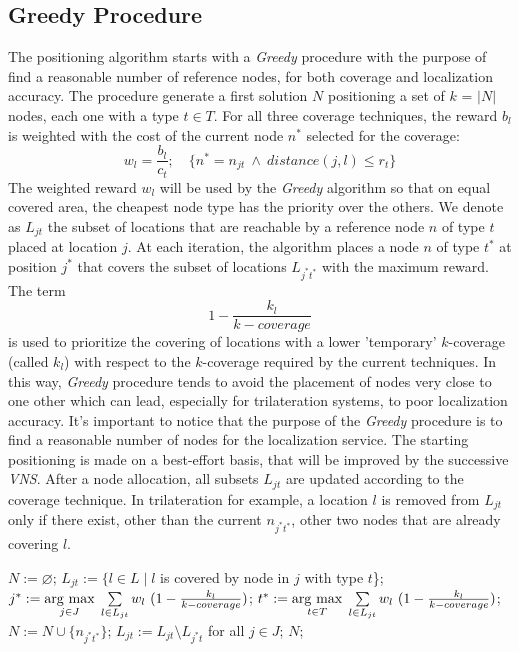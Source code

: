 \subsection{Greedy Procedure}\label{subsec:greedy}
The positioning algorithm starts with a \emph{Greedy} procedure with the purpose of find a reasonable number of reference nodes, for both coverage and localization accuracy. The procedure generate a first solution \(N\) positioning a set of \(k\) = $\lvert N \rvert$ nodes, each one with a type \(t \in T\).
For all three coverage techniques, the reward $b_l$ is weighted with the cost of the current node $n^*$ selected for the coverage:
\begin{equation}\label{eq:w}
w_l = \frac{b_l}{ c_t}; \quad \{n^*=n_{jt} ~ \land ~ distance(j,l)  \leq r_t\}
\end{equation}
The weighted reward $w_l$ will be used by the \emph{Greedy} algorithm so that on equal covered area, the cheapest node type has the priority over the others.
We denote as \(L_{jt}\) the subset of locations that are reachable by a reference node \(n\) of type \(t\) placed at location \(j\). At each iteration, the algorithm places a node \(n\) of type \(t^*\) at position \(j^*\) that covers the subset of locations \(L_{j^*t^*}\) with the maximum reward. The term
\begin{equation}\label{eq:kcov}
1 - \frac{k_l}{k-coverage}
\end{equation}
is used to prioritize the covering of locations with a lower 'temporary' \mbox{$k$-coverage} (called $k_l$) with respect to the \mbox{$k$-coverage} required by the current techniques. In this way, \emph{Greedy} procedure tends to avoid the placement of nodes very close to one other which can lead, especially for trilateration systems, to poor localization accuracy.
It's important to notice that the purpose of the \emph{Greedy} procedure is to find a reasonable number of nodes for the localization service. The starting positioning is made on a best-effort basis, that will be improved by the successive \emph{VNS}.
After a node allocation, all subsets \(L_{jt}\) are updated according to the coverage technique. In trilateration for example, a location \(l\) is removed from \(L_{jt}\) only if there exist, other than the current  \(n_{j^*t^*}\), other two nodes that are already covering \(l\).

\begin{algorithm}
\caption{\(Greedy(L, J, T, w, target)\)}
\begin{algorithmic}%
\label{alg:greedy}
\State $N := \varnothing$;
\State $L_{jt} := \{l \in L \mid l$ is covered by node in \(j\) with type \(t\)\};
\State $j^{*} := \underset{j \in J}{\operatorname{arg}\,\operatorname{max}}\; \sum\limits_{l \in L_{jt}}w_l ~ (1 - \frac{k_l}{k-coverage})$;
\State $t^{*} := \underset{t \in T}{\operatorname{arg}\,\operatorname{max}}\; \sum\limits_{l \in L_{jt}}w_l ~ (1 - \frac{k_l}{k-coverage})$;
\State $N := N \cup \{n_{j^*t^*}\}$;
\State $L_{jt} := L_{jt} \setminus L_{j^*t}$ for all $j \in J$;
\EndWhile
\State \Return $N$;
\end{algorithmic}
\end{algorithm}

